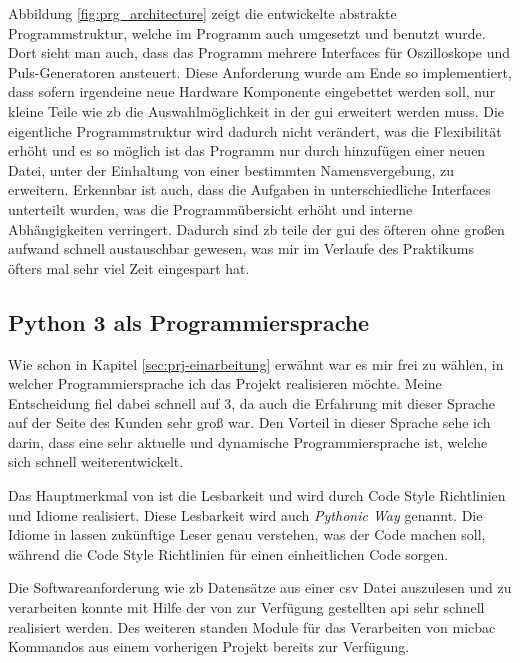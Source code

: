 Abbildung \ref{fig:prg_architecture} zeigt die entwickelte abstrakte Programmstruktur,
welche im Programm auch umgesetzt und benutzt wurde. Dort sieht man auch, dass das Programm
mehrere Interfaces für Oszilloskope und Puls-Generatoren ansteuert. Diese Anforderung wurde am
Ende so implementiert, dass sofern irgendeine neue Hardware Komponente eingebettet werden soll,
nur kleine Teile wie \ac{zb} die Auswahlmöglichkeit in der \ac{gui} erweitert werden muss. Die
eigentliche Programmstruktur wird dadurch nicht verändert, was die Flexibilität erhöht und es
so möglich ist das Programm nur durch hinzufügen einer neuen Datei, unter der Einhaltung von
einer bestimmten  Namensvergebung, zu erweitern. Erkennbar ist auch, dass die Aufgaben in
unterschiedliche Interfaces unterteilt wurden, was die Programmübersicht erhöht und  interne
Abhängigkeiten verringert. Dadurch sind \ac{zb} teile der \ac{gui} des öfteren ohne großen
aufwand schnell austauschbar gewesen, was mir im Verlaufe des Praktikums öfters mal sehr viel
Zeit eingespart hat.

	
\subsection{Python 3 als Programmiersprache}
\label{subsec:py3_as_lang}

Wie schon in Kapitel \ref{sec:prj-einarbeitung} erwähnt war es mir frei zu wählen, in welcher
Programmiersprache ich das Projekt realisieren möchte. Meine Entscheidung fiel dabei schnell
auf \cite{Python} 3, da auch die Erfahrung mit dieser Sprache auf der Seite des Kunden sehr 
groß war. Den Vorteil in dieser Sprache sehe ich darin, dass \cite{Python} eine sehr aktuelle 
und dynamische Programmiersprache ist, welche sich schnell weiterentwickelt. 

Das Hauptmerkmal von \cite{Python} ist die Lesbarkeit und wird durch Code Style Richtlinien und
Idiome realisiert. Diese Lesbarkeit wird auch \textit{Pythonic Way} genannt. Die Idiome in
\cite{Python} lassen zukünftige Leser genau verstehen, was der Code machen soll, während die
Code Style Richtlinien für einen einheitlichen Code sorgen.

Die Softwareanforderung wie \ac{zb} Datensätze aus einer \ac{csv} Datei auszulesen und zu 
verarbeiten konnte mit Hilfe der von \cite{Python} zur Verfügung gestellten \ac{api} sehr 
schnell realisiert werden. Des weiteren standen \cite{Python} Module für das Verarbeiten von 
\ac{micbac} Kommandos aus einem vorherigen Projekt bereits zur Verfügung.


